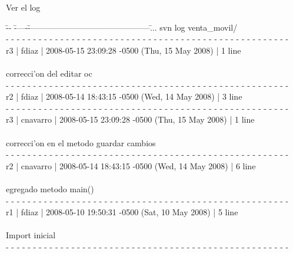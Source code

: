 \documentclass[xcolor=dvipsnames]{beamer}
\begin{document}
	\begin{frame}{Ver el log}
	\scriptsize
	{
	\begin{tabbing}
	\= -- \= -----\= ---------------------------------------------\=  ... \kill
	\>\> svn log venta\_movil/							\\
	\>\> - - - - - - - - - - - - - - - - - - - - - - - - - - - - - - - - - - - - - - - - - - - - - - - - - - - -\\
	\>\> r3 | fdiaz | 2008-05-15 23:09:28 -0500 (Thu, 15 May 2008) | 1 line\\ \\
	
	\>\> correcci'on del editar oc\\
	\>\> - - - - - - - - - - - - - - - - - - - - - - - - - - - - - - - - - - - - - - - - - - - - - - - - - - - -\\
	\>\> r2 | fdiaz | 2008-05-14 18:43:15 -0500 (Wed, 14 May 2008) | 3 line\\
	\>\> - - - - - - - - - - - - - - - - - - - - - - - - - - - - - - - - - - - - - - - - - - - - - - - - - - - -\\
	\>\> r3 | cnavarro | 2008-05-15 23:09:28 -0500 (Thu, 15 May 2008) | 1 line\\ \\

	\>\> correcci'on en el metodo guardar cambios\\
	\>\> - - - - - - - - - - - - - - - - - - - - - - - - - - - - - - - - - - - - - - - - - - - - - - - - - - - -\\
	\>\> r2 | cnavarro | 2008-05-14 18:43:15 -0500 (Wed, 14 May 2008) | 6 line\\ \\

	\>\> egregado metodo main() \\
	\>\> - - - - - - - - - - - - - - - - - - - - - - - - - - - - - - - - - - - - - - - - - - - - - - - - - - - -\\
	\>\> r1 | fdiaz | 2008-05-10 19:50:31 -0500 (Sat, 10 May 2008) | 5 line\\ \\

	\>\> Import inicial\\
	\>\> - - - - - - - - - - - - - - - - - - - - - - - - - - - - - - - - - - - - - - - - - - - - - - - - - - - -\\
	\end{tabbing}
	}
	\end{frame}	
	
\end{document}

